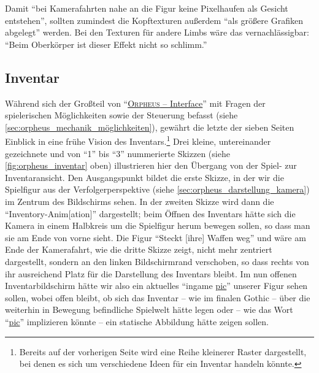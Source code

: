 \documentclass[a5paper,pagesize]{scrbook}
\begin{document}
Damit \enquote{bei Kamerafahrten nahe an die Figur keine Pixelhaufen als Gesicht entstehen}, sollten zumindest die Kopftexturen außerdem \enquote{als größere Grafiken abgelegt} werden.
Bei den Texturen für andere Limbs wäre das vernachlässigbar: \enquote{Beim Oberkörper ist dieser Effekt nicht so schlimm.}


\subsection{Inventar}\label{sec:orpheus_darstellung_inventar}
Während sich der Großteil von \enquote{\uline{\textsc{Orpheus} -- Interface}} mit Fragen der spielerischen Möglichkeiten sowie der Steuerung befasst (siehe \autoref{sec:orpheus_mechanik_möglichkeiten}), gewährt die letzte der sieben Seiten Einblick in eine frühe Vision des Inventars.\footnote{Bereits auf der vorherigen Seite wird eine Reihe kleinerer Raster dargestellt, bei denen es sich um verschiedene Ideen für ein Inventar handeln könnte.}
Drei kleine, untereinander gezeichnete und von \enquote{1} bis \enquote{3} nummerierte Skizzen (siehe \autoref{fig:orpheus_inventar} oben) illustrieren hier den Übergang von der Spiel- zur Inventar\-ansicht.
Den Ausgangspunkt bildet die erste Skizze, in der wir die Spielfigur aus der Verfolgerperspektive (siehe \autoref{sec:orpheus_darstellung_kamera}) im Zentrum des Bildschirms sehen.
In der zweiten Skizze wird dann die \enquote{Inventory-Anim[ation]} dargestellt; beim Öffnen des Inventars hätte sich die Kamera in einem Halbkreis um die Spielfigur herum bewegen sollen, so dass man sie am Ende von vorne sieht.
Die Figur \enquote{Steckt [ihre] Waffen weg} und wäre am Ende der Kamerafahrt, wie die dritte Skizze zeigt, nicht mehr zentriert dargestellt, sondern an den linken Bildschirmrand verschoben, so dass rechts von ihr ausreichend Platz für die Darstellung des Inventars bleibt.
Im nun offenen Inventarbildschirm hätte wir also ein aktuelles \enquote{ingame \uline{pic}} unserer Figur sehen sollen, wobei offen bleibt, ob sich das Inventar -- wie im finalen Gothic -- über die weiterhin in Bewegung befindliche Spielwelt hätte legen oder -- wie das Wort \enquote{\uline{pic}} implizieren könnte -- ein statische Abbildung hätte zeigen sollen.
\end{document}
